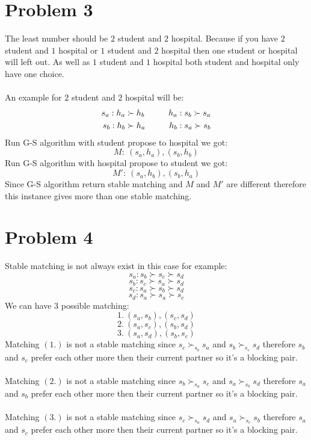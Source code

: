 \documentclass{article}
\newcommand\tab[1][1cm]{\hspace*{#1}}
\begin{document}
\section{Problem 3}
The least number should be $2$ student and $2$ hospital. Because if you have $2$ student and $1$ hospital or $1$ student and $2$ hospital then one student or hospital will left out. As well as $1$ student and $1$ hospital both student and hospital only have one choice.\\\\
An example for $2$ student and $2$ hospital will be:
\begin{align*}
s_a: h_a \succ h_b \tab h_a: s_b \succ s_a\\
s_b: h_b \succ h_a \tab h_b: s_a \succ s_b
\end{align*}
Run G-S algorithm with student propose to hospital we got:
$$M:\ (s_a,h_a), (s_b,h_b)$$
Run G-S algorithm with hospital propose to student we got:
$$M':\ (s_a,h_b), (s_b,h_a)$$
Since G-S algorithm return stable matching and $M$ and $M'$ are different therefore this instance gives more than one stable matching.

 
\newpage
\section{Problem 4}
Stable matching is not always exist in this case for example:\\
$$s_a: s_b \succ s_c \succ s_d$$
$$s_b: s_c \succ s_a \succ s_d$$
$$s_c: s_a \succ s_b \succ s_d$$
$$s_d: s_a \succ s_a \succ s_c$$
We can have 3 possible matching:
$$1.\ (s_a,s_b), (s_c,s_d)$$
$$2.\ (s_a,s_c), (s_b,s_d)$$
$$3.\ (s_a,s_d), (s_b,s_c)$$
Matching $(1.)$ is not a stable matching since $s_c \succ_{s_b} s_a$ and $s_b \succ_{s_c} s_d$ therefore $s_b$ and $s_c$ prefer each other more then their current partner so it's a blocking pair.\\\\
Matching $(2.)$ is not a stable matching since $s_b \succ_{s_a} s_c$ and $s_a \succ_{s_b} s_d$ therefore $s_a$ and $s_b$ prefer each other more then their current partner so it's a blocking pair.\\\\
Matching $(3.)$ is not a stable matching since $s_c \succ_{s_a} s_d$ and $s_a \succ_{s_c} s_b$ therefore $s_a$ and $s_c$ prefer each other more then their current partner so it's a blocking pair.\\\\
\newpage
\end{document}
